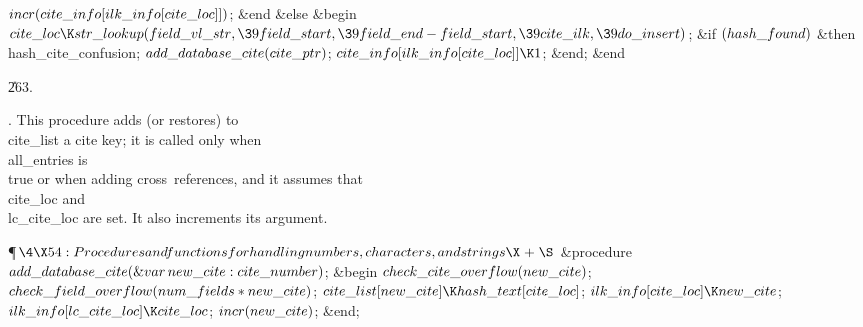 $\\{incr}(\\{cite\_info}[\\{ilk\_info}[\\{cite\_loc}]])$;\2\6
\&{end}\6
\4\&{else} \&{begin} \6
$\\{cite\_loc}\K\\{str\_lookup}(\\{field\_vl\_str},\39\\{field\_start},\39%
\\{field\_end}-\\{field\_start},\39\\{cite\_ilk},\39\\{do\_insert})$;\6
\&{if} $(\\{hash\_found})$ \1\&{then}\5
\\{hash\_cite\_confusion};\2\6
$\\{add\_database\_cite}(\\{cite\_ptr})$;\6
$\\{cite\_info}[\\{ilk\_info}[\\{cite\_loc}]]\K1$;\6
\&{end};\2\6
\&{end}\par
\U263.\fi

.
This procedure adds (or restores) to \\{cite\_list} a cite key; it is
called only when \\{all\_entries} is \\{true} or when adding
cross~references, and it assumes that \\{cite\_loc} and \\{lc\_cite\_loc} are
set.  It also increments its argument.

\Y\P$\4\X54:Procedures and functions for handling numbers, characters, and
strings\X\mathrel{+}\S$\6
\4\&{procedure}\1\  $\\{add\_database\_cite}(\mathop{\&{var}}\\{new\_cite}:%
\\{cite\_number})$;\2\6
\&{begin} $\\{check\_cite\_overflow}(\\{new\_cite})$;\6
$\\{check\_field\_overflow}(\\{num\_fields}\ast\\{new\_cite})$;\5
$\\{cite\_list}[\\{new\_cite}]\K\\{hash\_text}[\\{cite\_loc}]$;\5
$\\{ilk\_info}[\\{cite\_loc}]\K\\{new\_cite}$;\5
$\\{ilk\_info}[\\{lc\_cite\_loc}]\K\\{cite\_loc}$;\5
$\\{incr}(\\{new\_cite})$;\6
\&{end};\par
\fi


